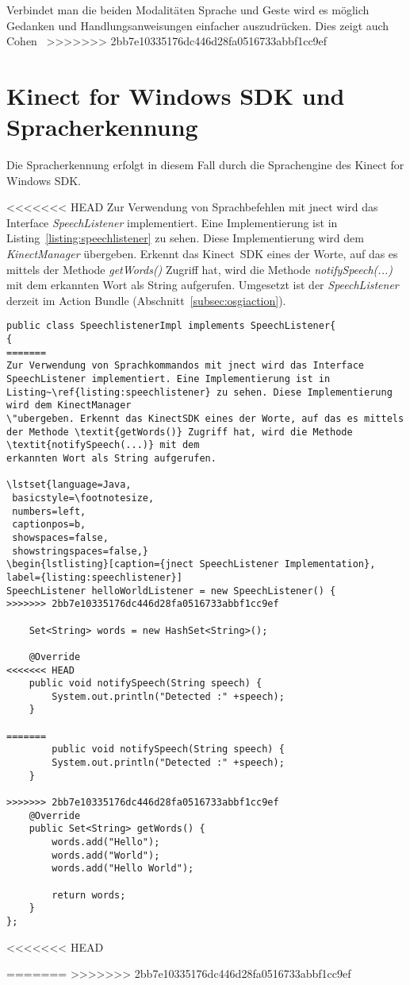 Verbindet man die beiden Modalit\"aten Sprache und Geste wird es m\"oglich Gedanken und Handlungsanweisungen einfacher auszudr\"ucken. Dies zeigt auch Cohen~\cite{bib:}
>>>>>>> 2bb7e10335176dc446d28fa0516733abbf1cc9ef

\section{Kinect for Windows SDK und Spracherkennung}

Die Spracherkennung erfolgt in diesem Fall durch die Sprachengine des Kinect for Windows SDK.

<<<<<<< HEAD
Zur Verwendung von Sprachbefehlen mit jnect wird das Interface \textit{SpeechListener} implementiert. Eine Implementierung ist in 
Listing~\ref{listing:speechlistener} zu sehen. Diese Implementierung wird dem \textit{KinectManager} \"ubergeben. Erkennt das 
Kinect~SDK eines der Worte, auf das es mittels der Methode \textit{getWords()} Zugriff hat, wird die Methode \textit{notifySpeech(...)} mit dem 
erkannten Wort als String aufgerufen. Umgesetzt ist der \textit{SpeechListener} derzeit im Action Bundle (Abschnitt~\ref{subsec:osgiaction}).

\par\smallskip
\lstset{language=Java}
\begin{lstlisting}[caption={jnect SpeechListener Implementation}, label={listing:speechlistener}]
public class SpeechlistenerImpl implements SpeechListener{
{
=======
Zur Verwendung von Sprachkommandos mit jnect wird das Interface SpeechListener implementiert. Eine Implementierung ist in Listing~\ref{listing:speechlistener} zu sehen. Diese Implementierung wird dem KinectManager 
\"ubergeben. Erkennt das KinectSDK eines der Worte, auf das es mittels der Methode \textit{getWords()} Zugriff hat, wird die Methode \textit{notifySpeech(...)} mit dem 
erkannten Wort als String aufgerufen.

\lstset{language=Java,
 basicstyle=\footnotesize, 
 numbers=left,
 captionpos=b,
 showspaces=false,             
 showstringspaces=false,}
\begin{lstlisting}[caption={jnect SpeechListener Implementation}, label={listing:speechlistener}]
SpeechListener helloWorldListener = new SpeechListener() {
>>>>>>> 2bb7e10335176dc446d28fa0516733abbf1cc9ef
			
	Set<String> words = new HashSet<String>();
			
	@Override
<<<<<<< HEAD
	public void notifySpeech(String speech) {
		System.out.println("Detected :" +speech);
	}
		
=======
		public void notifySpeech(String speech) {
		System.out.println("Detected :" +speech);
	}
			
>>>>>>> 2bb7e10335176dc446d28fa0516733abbf1cc9ef
	@Override
	public Set<String> getWords() {
		words.add("Hello");
		words.add("World");
		words.add("Hello World");
				
		return words;
	}
};
\end{lstlisting}
<<<<<<< HEAD
\par\smallskip
=======
>>>>>>> 2bb7e10335176dc446d28fa0516733abbf1cc9ef


